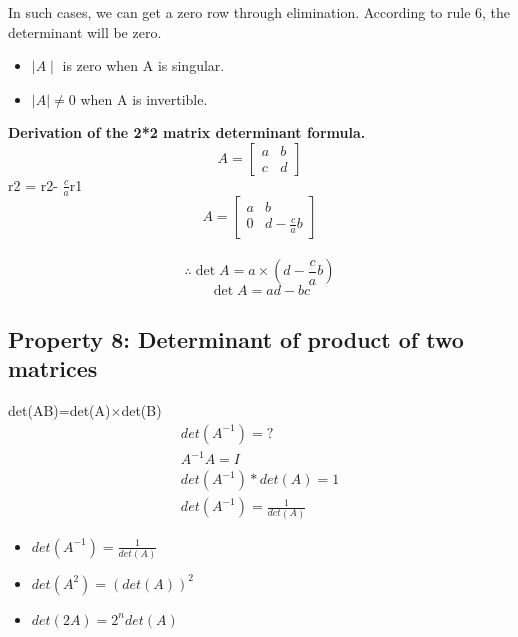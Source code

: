 \documentclass[]{article}
\begin{document}
In such cases, we can get a zero row through elimination. According to rule 6, the determinant will be zero.\\

\begin{mytheorem}
	\begin{itemize}
		\item $\mid A \mid$ is zero when A is singular.
		\item $\mid A \mid \neq 0$ when A is invertible.
	\end{itemize}
\end{mytheorem}
\vspace{5pt}
\noindent
\textbf{Derivation of the 2*2 matrix determinant formula.}\\

\noindent
\[
A=\begin{bmatrix}
	a&b\\
	c&d
\end{bmatrix}
\]
\noindent
r2 = r2- $\frac{c}{a}$r1\\

\noindent
\[
A=\begin{bmatrix}
	a&b\\
	0&d-\frac{c}{a}b
\end{bmatrix}
\]\\

\noindent
\[
\therefore \det{A} = a \times (d-\frac{c}{a}b)
\]
\[
\det{A} = ad-bc
\]

\vspace{10pt}

\subsection{Property 8: Determinant of product of two matrices}
\vspace{10pt}

det(AB)=det(A)$\times$det(B)\\

\noindent
\begin{equation*}
	\begin{split}
	det(A^{-1}) = ?\\
	A^{-1}A=I\\
	det(A^{-1})*det(A)=1\\
	det(A^{-1})=\frac{1}{det(A)}
	\end{split}
\end{equation*}
\vspace{10pt}

\begin{mytheorem}[title = Some important formulas]
	\begin{itemize}
		\item $det(A^{-1})=\frac{1}{det(A)}$
		\item $det(A^2)=(det(A))^2$
		\item $det(2A)=2^ndet(A)$
	\end{itemize}
\end{mytheorem}
\end{document}
